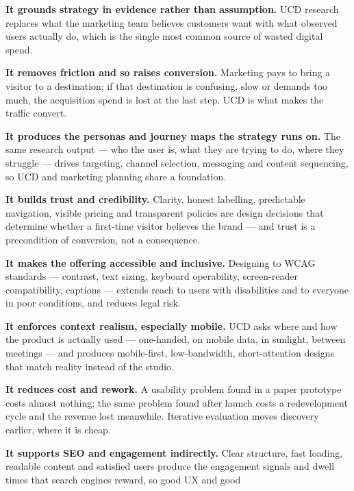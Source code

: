 \begin{qlist}
\begin{apts}
\item \textbf{It grounds strategy in evidence rather than assumption.} UCD
      research replaces what the marketing team believes customers want with
      what observed users actually do, which is the single most common source
      of wasted digital spend.
\item \textbf{It removes friction and so raises conversion.} Marketing pays to
      bring a visitor to a destination; if that destination is confusing, slow
      or demands too much, the acquisition spend is lost at the last step. UCD
      is what makes the traffic convert.
\item \textbf{It produces the personas and journey maps the strategy runs on.}
      The same research output --- who the user is, what they are trying to do,
      where they struggle --- drives targeting, channel selection, messaging
      and content sequencing, so UCD and marketing planning share a foundation.
\item \textbf{It builds trust and credibility.} Clarity, honest labelling,
      predictable navigation, visible pricing and transparent policies are
      design decisions that determine whether a first-time visitor believes the
      brand --- and trust is a precondition of conversion, not a consequence.
\item \textbf{It makes the offering accessible and inclusive.} Designing to
      WCAG standards --- contrast, text sizing, keyboard operability,
      screen-reader compatibility, captions --- extends reach to users with
      disabilities and to everyone in poor conditions, and reduces legal risk.
\item \textbf{It enforces context realism, especially mobile.} UCD asks where
      and how the product is actually used --- one-handed, on mobile data, in
      sunlight, between meetings --- and produces mobile-first, low-bandwidth,
      short-attention designs that match reality instead of the studio.
\item \textbf{It reduces cost and rework.} A usability problem found in a
      paper prototype costs almost nothing; the same problem found after
      launch costs a redevelopment cycle and the revenue lost meanwhile.
      Iterative evaluation moves discovery earlier, where it is cheap.
\item \textbf{It supports SEO and engagement indirectly.} Clear structure, fast
      loading, readable content and satisfied users produce the engagement
      signals and dwell times that search engines reward, so good UX and good

\end{apts}
\end{qlist}
